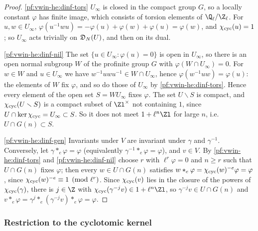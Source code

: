 \begin{proof}
\ref{pf:vwin-he:dinf-tors} $U_\infty$ is closed in the compact group $G$, so a locally constant $\varphi$ has finite
image, which consists of torsion elements of $\vwinheQZ$. For $u,w\in U_\infty$,
$\varphi(u^{-1}wu)=-\varphi(u)+\varphi(w)+\varphi(u)=\varphi(w)$, and $\chi_{\mathrm{cyc}}(u)=1$; so $U_\infty$ acts
trivially on $\mathfrak D_N(U)$, and then on its dual.

\ref{pf:vwin-he:dinf-nil} The set $\{u\in U_\infty:\varphi(u)=0\}$ is open in $U_\infty$, so there is an open normal
subgroup $W$ of the profinite group $G$ with $\varphi(W\cap U_\infty)=0$. For $w\in W$ and $u\in U_\infty$ we have
$w^{-1}uwu^{-1}\in W\cap U_\infty$, hence $\varphi(w^{-1}uw)=\varphi(u)$: the elements of $W$ fix $\varphi$, and so do
those of $U_\infty$ by \ref{pf:vwin-he:dinf-tors}. Hence every element of the open set $S=WU_\infty$ fixes
$\varphi$. The set $U\smallsetminus S$ is compact, and $\chi_{\mathrm{cyc}}(U\smallsetminus S)$ is a compact subset of
$\Zl^\times$ not containing $1$, since $U\cap\ker\chi_{\mathrm{cyc}}=U_\infty\subset S$. So it does not meet $1+\ell^n\Zl$
for large $n$, i.e.\ $U\cap G(n)\subset S$.

\ref{pf:vwin-he:dinf-gen} Invariants under $V$ are invariant under $\gamma$ and $\gamma^{-1}$. Conversely, let
$\gamma\ast_e\varphi=\varphi$ (equivalently $\gamma^{-1}\ast_e\varphi=\varphi$), and $v\in V$. By
\ref{pf:vwin-he:dinf-tors} and \ref{pf:vwin-he:dinf-nil} choose $r$ with $\ell^r\varphi=0$ and $n\ge r$ such that
$U\cap G(n)$ fixes $\varphi$; then every $w\in U\cap G(n)$ satisfies $w\ast_e\varphi=\chi_{\mathrm{cyc}}(w)^{-e}\varphi=\varphi$,
since $\chi_{\mathrm{cyc}}(w)^{-e}\equiv1\pmod{\ell^r}$. Since $\chi_{\mathrm{cyc}}(v)$ lies in the closure of the powers of
$\chi_{\mathrm{cyc}}(\gamma)$, there is $j\in\Z$ with $\vwinhecyc(\gamma^{-j}v)\in1+\ell^n\Zl$, so
$\gamma^{-j}v\in U\cap G(n)$ and $v\ast_e\varphi=\gamma^j\ast_e(\gamma^{-j}v)\ast_e\varphi=\varphi$.
\end{proof}

\subsubsection{Restriction to the cyclotomic kernel}

